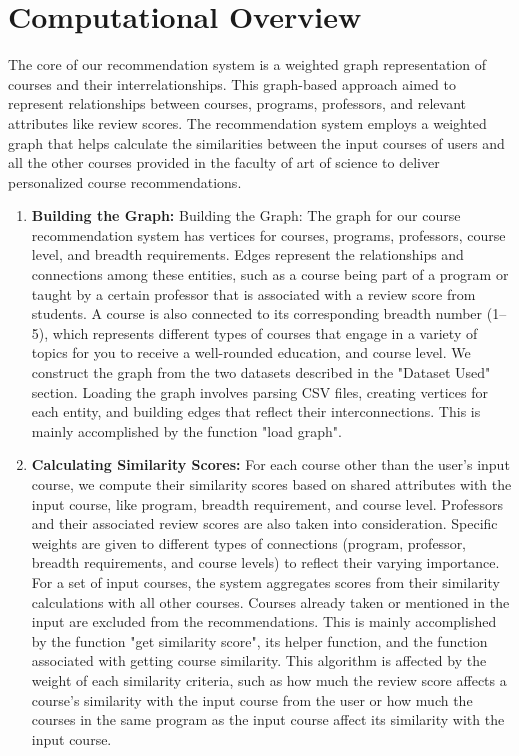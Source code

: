 \documentclass[fontsize=11pt]{article}
\begin{document}
\section*{Computational Overview}
The core of our recommendation system is a weighted graph representation of courses and their interrelationships. This graph-based approach aimed to represent relationships between courses, programs, professors, and relevant attributes like review scores. The recommendation system employs a weighted graph that helps calculate the similarities between the input courses of users and all the other courses provided in the faculty of art of science to deliver personalized course recommendations.
\begin{enumerate}
    \item \textbf{Building the Graph:} {Building the Graph:} The graph for our course recommendation system has vertices for courses, programs, professors, course level, and breadth requirements. Edges represent the relationships and connections among these entities, such as a course being part of a program or taught by a certain professor that is associated with a review score from students. A course is also connected to its corresponding breadth number (1–5), which represents different types of courses that engage in a variety of topics for you to receive a well-rounded education, and course level. We construct the graph from the two datasets described in the "Dataset Used" section. Loading the graph involves parsing CSV files, creating vertices for each entity, and building edges that reflect their interconnections. This is mainly accomplished by the function "load graph".
    \item \textbf{Calculating Similarity Scores:} For each course other than the user's input course, we compute their similarity scores based on shared attributes with the input course, like program, breadth requirement, and course level. Professors and their associated review scores are also taken into consideration. Specific weights are given to different types of connections (program, professor, breadth requirements, and course levels) to reflect their varying importance. For a set of input courses, the system aggregates scores from their similarity calculations with all other courses. Courses already taken or mentioned in the input are excluded from the recommendations. This is mainly accomplished by the function "get similarity score", its helper function, and the function associated with getting course similarity. This algorithm is affected by the weight of each similarity criteria, such as how much the review score affects a course's similarity with the input course from the user or how much the courses in the same program as the input course affect its similarity with the input course.

\end{enumerate}
\end{document}
